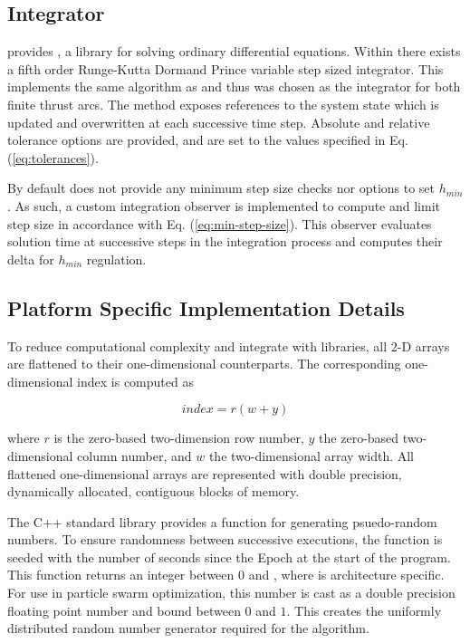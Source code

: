 \subsection{Integrator}

\noindent {} provides , a library for solving ordinary differential equations. Within 
there exists a fifth order Runge-Kutta Dormand Prince variable
step sized integrator. This implements the same algorithm as  and thus was chosen as the integrator for both finite
thrust arcs. The method exposes references to the system state which is updated and overwritten at each successive time step. Absolute
and relative tolerance options are provided, and are set to the values specified in Eq. (\ref{eq:tolerances}). \newline

\noindent By default  does not provide any minimum step size checks nor options to set $h_{min}$.
As such, a custom integration observer is implemented to compute and limit step size in accordance with Eq. (\ref{eq:min-step-size}). 
This observer evaluates solution time at successive steps in the integration process and computes their delta for 
$h_{min}$ regulation.

\subsection{Platform Specific Implementation Details}

\noindent To reduce computational complexity and integrate with  libraries, all 2-D arrays
are flattened to their one-dimensional counterparts. The corresponding one-dimensional index is computed as

\begin{equation}
    index = r(w+y)
    \label{eq:index-conversion}
\end{equation}

\noindent where $r$ is the zero-based two-dimension row number, $y$ the zero-based two-dimensional column number, and $w$ the two-dimensional array width. All flattened one-dimensional arrays are represented with double precision, dynamically allocated, contiguous blocks
of memory. \newline

\noindent
The C++ standard library provides a  function for generating psuedo-random numbers.
To ensure randomness between successive executions, the  function is seeded with the number
of seconds since the Epoch at the start of the program. This function returns an integer 
between $0$ and , where  is architecture specific. 
For use in particle swarm optimization, this number is cast as a double
precision floating point number and bound between $0$ and $1$. This creates the uniformly distributed
random number generator required for the algorithm. \newline

